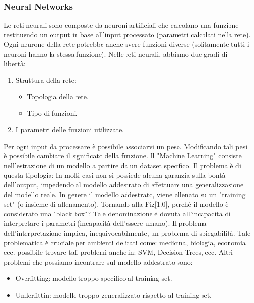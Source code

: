 \subsubsection{Neural Networks}
Le reti neurali sono composte da neuroni artificiali che calcolano una funzione restituendo un output in base all'input processato (parametri calcolati nella rete). Ogni neurone della rete potrebbe 
anche avere funzioni diverse (solitamente tutti i neuroni hanno la stessa funzione).
Nelle reti neurali, abbiamo due gradi di libertà:
\begin{enumerate}
    \item Struttura della rete:
        \begin{itemize}
            \item Topologia della rete.
            \item Tipo di funzioni.
        \end{itemize}
    \item I parametri delle funzioni utilizzate.
\end{enumerate}
Per ogni input da processare è possibile associarvi un peso. Modificando tali pesi è possibile cambiare il significato della funzione.
\newline
Il "Machine Learning" consiste nell'estrazione di un modello a partire da un dataset specifico. 
Il problema è di questa tipologia: 
In molti casi non si possiede alcuna garanzia sulla bontà dell'output, impedendo al modello addestrato di effettuare una generalizzazione del modello reale.
In genere il modello addestrato, viene allenato su un "training set" (o insieme di allenamento). 
\newline
Tornando alla Fig[1.0], perché il modello è considerato una "black box"? 
Tale denominazione è dovuta all'incapacità di interpretare i parametri (incapacità dell'essere umano).
\newline
Il problema dell'interpretazione implica, inequivocabilmente, un problema di spiegabilità. Tale problematica è cruciale per ambienti delicati come: medicina, biologia, economia ecc.
\newline
{} possibile trovare tali problemi anche in: SVM, Decision Trees, ecc.
Altri problemi che possiamo incontrare sul modello addestrato sono: 
\begin{itemize}
    \item Overfitting: modello troppo specifico al training set.
    \item Underfittin: modello troppo generalizzato rispetto al training set.
\end{itemize}

